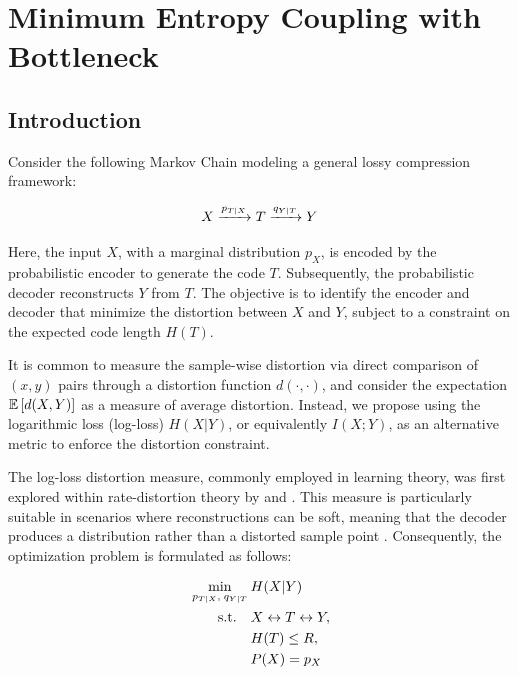 \chapter{Minimum Entropy Coupling with Bottleneck}\label{ch:mecb}

\section{Introduction}\label{ch3:sec:introduction}

Consider the following Markov Chain modeling a general lossy compression framework:

\begin{equation}
    X \xrightarrow{p_{T|X}} T \xrightarrow{q_{Y|T}} Y
\end{equation}

Here, the input $X$, with a marginal distribution $p_X$, is encoded by the probabilistic encoder \enc to generate the code $T$. Subsequently, the probabilistic decoder \dec reconstructs $Y$ from $T$. The objective is to identify the encoder and decoder that minimize the distortion between $X$ and $Y$, subject to a constraint on the expected code length $H(T)$.

It is common to measure the sample-wise distortion via direct comparison of $(x, y)$ pairs through a distortion function $d(\cdot, \cdot)$, and consider the expectation $\mathbb{E} \left[ d(X,Y)  \right]$ as a measure of average distortion. Instead, we propose using the logarithmic loss (log-loss) $H(X|Y)$, or equivalently $I(X;Y)$, as an alternative metric to enforce the distortion constraint.

The log-loss distortion measure, commonly employed in learning theory, was first explored within rate-distortion theory by \cite{courtade2011multiterminal} and \cite{courtade2013multiterminal}. This measure is particularly suitable in scenarios where reconstructions can be soft, meaning that the decoder produces a distribution rather than a distorted sample point \cite{shkel2017single}. Consequently, the optimization problem is formulated as follows:

\begin{equation}
\begin{aligned} \label{ch3:eq:no_const}
    &\min_{p_{T|X},\; q_{Y|T}} \hspace{-1em} &&H(X|Y) \\
    &\hspace{2em} \textrm{s.t.} &&X \leftrightarrow T \leftrightarrow Y, \\
    & &&H(T) \leq R, \\
    & &&P(X) = p_X
\end{aligned}
\end{equation}

